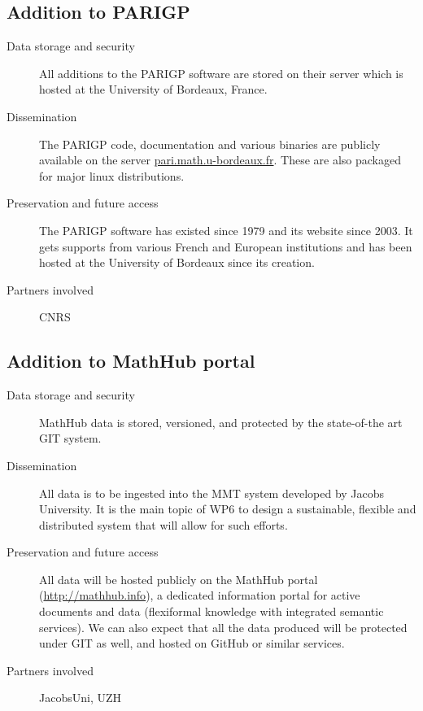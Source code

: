 \documentclass{../../Proposal/LaTeX-proposal/deliverablereport}
\begin{document}
\subsection{Addition to PARIGP}

\begin{description}
\item[Data storage and security] All additions to the PARIGP software are stored on their server which is hosted at the University of Bordeaux, France.
\item[Dissemination] The PARIGP code, documentation and various binaries are publicly available on the server \href{http://pari.math.u-bordeaux.fr/}{pari.math.u-bordeaux.fr}. These are also packaged for major linux distributions.
\item[Preservation and future access] The PARIGP software has existed
  since 1979 and its website since 2003. It gets supports from various
  French and European institutions and has been hosted at the University of Bordeaux since its creation.
\item[Partners involved] CNRS
\end{description}


\subsection{Addition to MathHub portal}


\begin{description}
\item[Data storage and security] MathHub data is stored, versioned, and protected by the
state-of-the art GIT system.
\item[Dissemination] All data is to be ingested into the MMT system developed by Jacobs University. It is the main topic of WP6 to design a sustainable, flexible and distributed system that will allow for such efforts.
\item[Preservation and future access] All data will be hosted publicly on the MathHub portal (\url{http://mathhub.info}), a
dedicated information portal for active documents and data (flexiformal knowledge with
integrated semantic services). We can also expect that all the data produced will be protected under GIT as well, and hosted on GitHub or similar services. 
\item[Partners involved] JacobsUni, UZH
\end{description}
\end{document}
